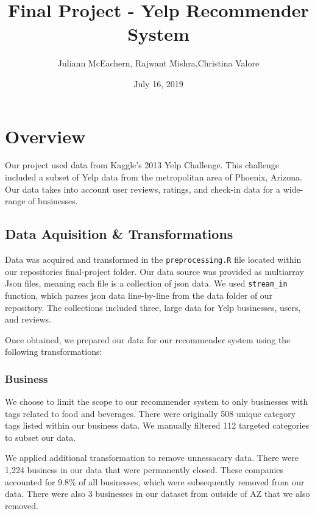 \documentclass[]{article}
\title{Final Project - Yelp Recommender System}
\author{Juliann McEachern, Rajwant Mishra,Christina Valore}
\date{July 16, 2019}
\begin{document}
\maketitle

{
\setcounter{tocdepth}{2}
\tableofcontents
}
\hypertarget{overview}{%
\section{Overview}\label{overview}}

Our project used data from Kaggle's 2013 Yelp Challenge. This challenge
included a subset of Yelp data from the metropolitan area of Phoenix,
Arizona. Our data takes into account user reviews, ratings, and check-in
data for a wide-range of businesses.

\hypertarget{data-aquisition-transformations}{%
\subsection{Data Aquisition \&
Transformations}\label{data-aquisition-transformations}}

Data was acquired and transformed in the \texttt{preprocessing.R} file
located within our repositories final-project folder. Our data source
was provided as multiarray Json files, meaning each file is a collection
of json data. We used \texttt{stream\_in} function, which parses json
data line-by-line from the data folder of our repository. The
collections included three, large data for Yelp businesses, users, and
reviews.

Once obtained, we prepared our data for our recommender system using the
following transformations:

\hypertarget{business}{%
\subsubsection{Business}\label{business}}

We choose to limit the scope to our recommender system to only
businesses with tags related to food and beverages. There were
originally 508 unique category tags listed within our business data. We
manually filtered 112 targeted categories to subset our data.

We applied additional transformation to remove unnessacary data. There
were 1,224 business in our data that were permanently closed. These
companies accounted for 9.8\% of all businesses, which were subsequently
removed from our data. There were also 3 businesses in our dataset from
outside of AZ that we also removed.
\end{document}
